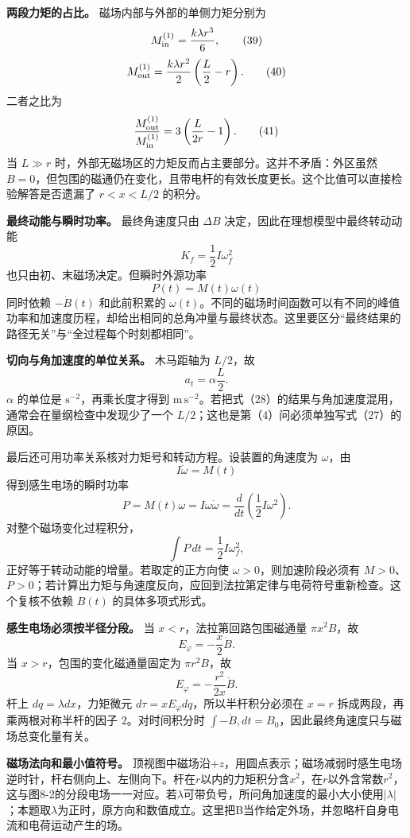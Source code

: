 \documentclass[12pt,a4paper,UTF8]{ctexart}
\begin{document}
\textbf{两段力矩的占比。} 磁场内部与外部的单侧力矩分别为 \[
M_{\rm in}^{(1)}
=\frac{k\lambda r^3}{6}, \tag{39}
\] \[
M_{\rm out}^{(1)}
=\frac{k\lambda r^2}{2}\left(\frac L2-r\right). \tag{40}
\] 二者之比为 \[
\frac{M_{\rm out}^{(1)}}{M_{\rm in}^{(1)}}
=3\left(\frac{L}{2r}-1\right). \tag{41}
\] 当 \(L\gg r\)
时，外部无磁场区的力矩反而占主要部分。这并不矛盾：外区虽然
\(B=0\)，但包围的磁通仍在变化，且带电杆的有效长度更长。这个比值可以直接检验解答是否遗漏了
\(r<x<L/2\) 的积分。

\textbf{最终动能与瞬时功率。} 最终角速度只由 \(\Delta B\)
决定，因此在理想模型中最终转动动能 \[
K_f=\frac12I\omega_f^2 \tag{42}
\] 也只由初、末磁场决定。但瞬时外源功率 \[
P(t)=M(t)\omega(t) \tag{43}
\] 同时依赖 \(-\dot B(t)\) 和此前积累的
\(\omega(t)\)。不同的磁场时间函数可以有不同的峰值功率和加速度历程，却给出相同的总角冲量与最终状态。这里要区分``最终结果的路径无关''与``全过程每个时刻都相同''。

\textbf{切向与角加速度的单位关系。} 木马距轴为 \(L/2\)，故 \[
a_t=\alpha\frac L2. \tag{44}
\] \(\alpha\) 的单位是 \(\mathrm{s^{-2}}\)，再乘长度才得到
\(\mathrm{m\,s^{-2}}\)。若把式（28）的结果与角加速度混用，通常会在量纲检查中发现少了一个
\(L/2\)；这也是第（4）问必须单独写式（27）的原因。

最后还可用功率关系核对力矩号和转动方程。设装置的角速度为 \(\omega\)，由
\[
I\dot\omega=M(t)
\] 得到感生电场的瞬时功率 \[
P=M(t)\omega
=I\omega\dot\omega
=\frac{d}{dt}\left(\frac12I\omega^2\right).
\] 对整个磁场变化过程积分， \[
\int P\,dt=\frac12I\omega_f^2,
\] 正好等于转动动能的增量。若取定的正方向使
\(\omega>0\)，则加速阶段必须有
\(M>0\)、\(P>0\)；若计算出力矩与角速度反向，应回到法拉第定律与电荷符号重新检查。这个复核不依赖
\(B(t)\) 的具体多项式形式。

\textbf{感生电场必须按半径分段。} 当 \(x<r\)，法拉第回路包围磁通量
\(\pi x^2B\)，故 \[
E_\varphi=-\frac{x}{2}\dot B.
\] 当 \(x>r\)，包围的变化磁通量固定为 \(\pi r^2B\)，故 \[
E_\varphi=-\frac{r^2}{2x}\dot B.
\] 杆上 \(dq=\lambda dx\)，力矩微元
\(d\tau=xE_\varphi dq\)，所以半杆积分必须在 \(x=r\)
拆成两段，再乘两根对称半杆的因子 \(2\)。对时间积分时
\(\int-\dot B,dt=B_0\)，因此最终角速度只与磁场总变化量有关。

\textbf{磁场法向和最小值符号。}
顶视图中磁场沿\(+z\)，用圆点表示；磁场减弱时感生电场逆时针，杆右侧向上、左侧向下。杆在\(r\)以内的力矩积分含\(x^2\)，在\(r\)以外含常数\(r^2\)，这与图8-2的分段电场一一对应。若\(\lambda\)可带负号，所问角加速度的最小大小使用\(|\lambda|\)；本题取\(\lambda\)为正时，原方向和数值成立。这里把B当作给定外场，并忽略杆自身电流和电荷运动产生的场。
\end{document}
